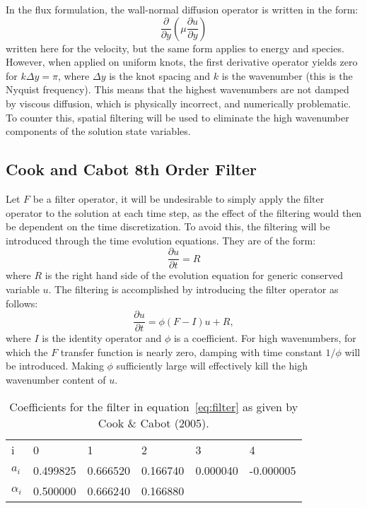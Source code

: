 In the flux formulation, the wall-normal diffusion operator is written
in the form:
\begin{equation}
\frac{\partial}{\partial y}\left(\mu\frac{\partial u}{\partial y}\right)
\end{equation}
written here for the velocity, but the same form applies to energy and
species. However, when applied on uniform knots, the first derivative
operator yields zero for $k\Delta y=\pi$, where $\Delta y$ is the knot
spacing and $k$ is the wavenumber (this is the Nyquist frequency). This
means that the highest wavenumbers are not damped by viscous diffusion,
which is physically incorrect, and numerically problematic. To counter
this, spatial filtering will be used to eliminate the high wavenumber
components of the solution state variables.


\subsection{Cook and Cabot 8th Order Filter}
Let $F$ be a filter operator, it will be undesirable to simply apply the
filter operator to the solution at each time step, as the effect of the
filtering would then be dependent on the time discretization. To avoid
this, the filtering will be introduced through the time evolution
equations. They are of the form:
\begin{equation}
\frac{\partial u}{\partial t} = R
\end{equation}
where $R$ is the right hand side of the evolution equation for generic
conserved variable $u$. The filtering is accomplished by introducing the
filter operator as follows:
\begin{equation}
\frac{\partial u}{\partial t} = \phi(F-I)u + R,
\label{eq:time_filter}
\end{equation}
where $I$ is the identity operator and $\phi$ is a coefficient. For high
wavenumbers, for which the $F$ transfer function is nearly zero, damping
with time constant $1/\phi$ will be introduced. Making $\phi$
sufficiently large will effectively kill the high wavenumber content of
$u$.

\begin{table}[t]
\begin{center}
\begin{tabular}{llllll}
i&0&1&2&3&4\\
$a_i$&0.499825&0.666520&0.166740&0.000040&-0.000005\\
$\alpha_i$&0.500000&0.666240&0.166880
\end{tabular}
\end{center}
\caption{Coefficients for the filter in equation~\ref{eq:filter} as
 given by Cook \& Cabot (2005).}
\label{tab:coefficients}
\end{table}

